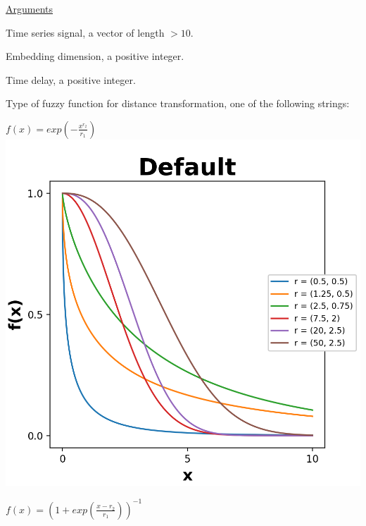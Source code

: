 \documentclass[12pt, a4paper, titlepage, openany]{book}
\begin{document}
\noindent \ul{Arguments}
\begin{description}[labelsep=1cm, labelwidth=2cm, nosep,style=multiline,leftmargin=3cm]\footnotesize
\item[\texttt{Sig}]		Time series signal, a vector of length $> 10$.
\item[\texttt{m}]		Embedding dimension, a positive integer.
\item[\texttt{tau}]		Time delay, a positive integer.
\item[\texttt{Fx}]		Type of fuzzy function for distance transformation, one of the following strings:
	\begin{description}[labelsep=14em, labelwidth=10em, nosep,style=multiline,leftmargin=6cm]
	\item[\texttt{"default"}]	$f(x) = exp(-\frac{x^{r_2}}{r_1})$\\
		\includegraphics[scale=.5]{Fuzz2.png}
	\item[\texttt{"sigmoid"/"modsampen"}]	$f(x) = (1+exp(\frac{x-r_2}{r_1}))^{-1}$\\

\end{description}
\end{description}
\end{document}

